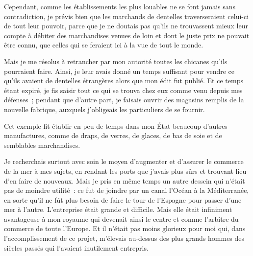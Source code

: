 \documentclass[french,twoside]{book} %
\begin{document}
Cependant, comme les établissements les plus louables ne se font jamais sans contradiction, je prévis bien que les marchands de dentelles traverseraient celui-ci de tout leur pouvoir, parce que je ne doutais pas qu’ils ne trouvassent mieux leur compte à débiter des marchandises venues de loin et dont le juste prix ne pouvait être connu, que celles qui se feraient ici à la vue de tout le monde.\par
Mais je me résolus à retrancher par mon autorité toutes les chicanes qu’ils pourraient faire. Ainsi, je leur avais donné un temps suffisant pour vendre ce qu’ils avaient de dentelles étrangères alors que mon édit fut publié. Et ce temps étant expiré, je fis saisir tout ce qui se trouva chez eux comme venu depuis mes défenses ; pendant que d’autre part, je faisais ouvrir des magasins remplis de la nouvelle fabrique, auxquels j’obligeais les particuliers de se fournir.\par
Cet exemple fit établir en peu de temps dans mon État beaucoup d’autres manufactures, comme de draps, de verres, de glaces, de bas de soie et de semblables marchandises.\par
Je recherchais surtout avec soin le moyen d’augmenter et d’assurer le commerce de la mer à mes sujets, en rendant les ports que j’avais plus sûrs et trouvant lieu d’en faire de nouveaux. Mais je pris en même temps un autre dessein qui n’était pas de moindre utilité : ce fut de joindre par un canal l’Océan à la Méditerranée, en sorte qu’il ne fût plus besoin de faire le tour de l’Espagne pour passer d’une mer à l’autre. L’entreprise était grande et difficile. Mais elle était infiniment avantageuse à mon royaume qui devenait ainsi le centre et comme l’arbitre du commerce de toute l’Europe. Et il n’était pas moins glorieux pour moi qui, dans l’accomplissement de ce projet, m’élevais au-dessus des plus grands hommes des siècles passés qui l’avaient inutilement entrepris.\par
\end{document}
